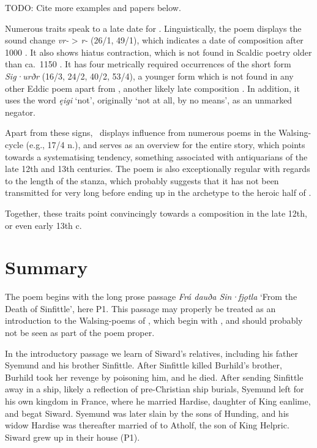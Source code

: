 TODO: Cite more examples and papers below.

Numerous traits speak to a late date for \Gripisspa.  Linguistically, the poem displays the sound change \emph{vr-} > \emph{r-} (26/1, 49/1), which indicates a date of composition after 1000 \ce.  It also shows hiatus contraction, which is not found in Scaldic poetry older than ca.~1150 \ce.  It has four metrically required occurrences of the short form \emph{Sig·urðr} (16/3, 24/2, 40/2, 53/4), a younger form which is not found in any other Eddic poem apart from , another likely late composition \parencite[138--139]{Sievers1889}.  In addition, it uses the word \emph{ęigi} ‘not’, originally ‘not at all, by no means’, as an unmarked negator.

Apart from these signs, \Gripisspa\ displays influence from numerous poems in the Walsing-cycle (e.g., 17/4 n.), and serves as an overview for the entire story, which points towards a systematising tendency, something associated with antiquarians of the late 12th and 13th centuries.  The poem is also exceptionally regular with regards to the length of the stanza, which probably suggests that it has not been transmitted for very long before ending up in the archetype to the heroic half of \Regius.

Together, these traits point convincingly towards a composition in the late 12th, or even early 13th c.

\section{Summary}

The poem begins with the long prose passage \emph{Frá dauða Sin·fjǫtla} ‘From the Death of Sinfittle’, here P1.  This passage may properly be treated as an introduction to the Walsing-poems of \Regius, which begin with \Gripisspa, and should probably not be seen as part of the poem proper.

In the introductory passage we learn of Siward’s relatives, including his father Syemund and his brother Sinfittle.  After Sinfittle killed Burhild’s brother, Burhild took her revenge by poisoning him, and he died.  After sending Sinfittle away in a ship, likely a reflection of pre-Christian ship burials, Syemund left for his own kingdom in France, where he married Hardise, daughter of King eanlime, and begat Siward.  Syemund was later slain by the sons of Hunding, and his widow Hardise was thereafter married of to Atholf, the son of King Helpric.  Siward grew up in their house (P1).

